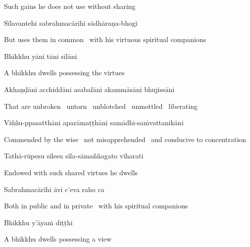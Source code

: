 \begin{english}
  Such gains he does not use without sharing
\end{english}

Sīlavantehi sabrahmacārīhi sādhāraṇa-bhogī

\begin{english-hang}
  But uses them in common \breathmark\ with his virtuous spiritual companions
\end{english-hang}

Bhikkhu yāni tāni sīlāni

\begin{english}
  A bhikkhu dwells possessing the virtues
\end{english}

\begin{pali-hang}
Akhaṇḍāni acchiddāni asabalāni akammāsāni bhujissāni
\end{pali-hang}

\begin{english-hang}
  That are unbroken \breathmark\ untorn \breathmark\ unblotched \breathmark\ unmottled \breathmark\ liberating
\end{english-hang}

\begin{pali-hang}
Viññu-ppasatthāni aparāmaṭṭhāni samādhi-saṁvattanikāni
\end{pali-hang}

\begin{english-hang}
  Commended by the wise \breathmark\ not misapprehended \breathmark\ and conducive to concentration
\end{english-hang}

Tathā-rūpesu sīlesu sīla-sāmaññagato viharati

\begin{english}
  Endowed with such shared virtues he dwells
\end{english}

Sabrahmacārīhi āvi c'eva raho ca

\begin{english-hang}
  Both in public and in private \breathmark\ with his spiritual companions
\end{english-hang}

Bhikkhu y'āyaṁ diṭṭhi

\begin{english}
  A bhikkhu dwells possessing a view
\end{english}

\ifafive\clearpage\fi


